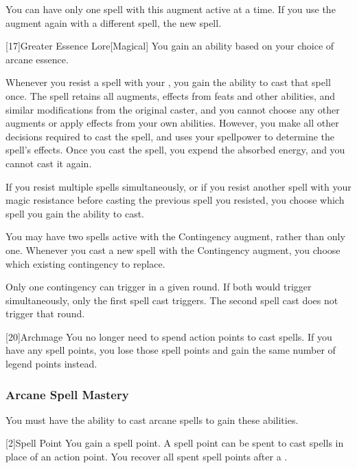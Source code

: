             You can have only one spell with this augment active at a time.
            If you use the augment again with a different spell, the new spell.

            [17]{Greater Essence Lore}[Magical]
            You gain an ability based on your choice of arcane essence.

             Whenever you resist a spell with your , you gain the ability to cast that spell once.
            The spell retains all augments, effects from feats and other abilities, and similar modifications from the original caster, and you cannot choose any other augments or apply effects from your own abilities.
            However, you make all other decisions required to cast the spell, and uses your spellpower to determine the spell's effects.
            Once you cast the spell, you expend the absorbed energy, and you cannot cast it again.

            If you resist multiple spells simultaneously, or if you resist another spell with your magic resistance before casting the previous spell you resisted, you choose which spell you gain the ability to cast.

             You may have two spells active with the Contingency augment, rather than only one.
            Whenever you cast a new spell with the Contingency augment, you choose which existing contingency to replace.

            Only one contingency can trigger in a given round.
            If both would trigger simultaneously, only the first spell cast triggers.
            The second spell cast does not trigger that round.

            [20]{Archmage}
            You no longer need to spend action points to cast spells.
            If you have any spell points, you lose those spell points and gain the same number of legend points instead.

        \subsubsection{Arcane Spell Mastery}
            You must have the ability to cast arcane spells to gain these abilities.

            [2]{Spell Point}
            You gain a spell point.
            A spell point can be spent to cast spells in place of an action point.
            You recover all spent spell points after a .

